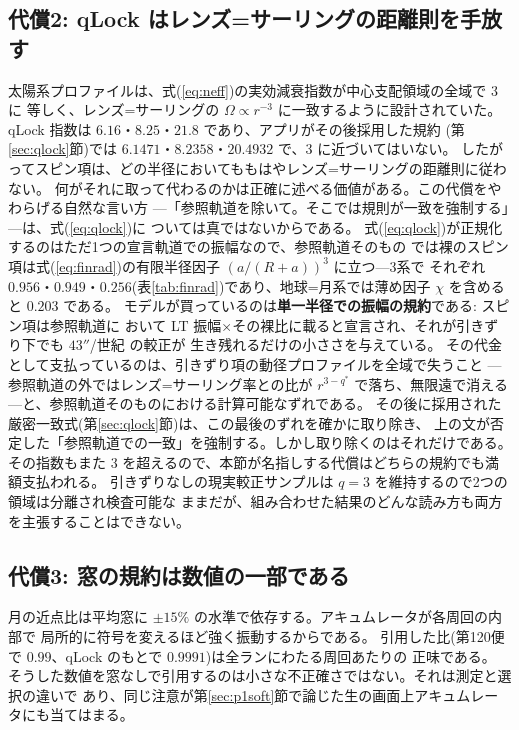 \documentclass[a4paper,10pt,twocolumn]{ltjsarticle}
\begin{document}
\subsection{代償2: qLock はレンズ=サーリングの距離則を手放す}
\label{sec:cost2}

太陽系プロファイルは、式(\ref{eq:neff})の実効減衰指数が中心支配領域の全域で $3$ に
等しく、レンズ=サーリングの $\Omega\propto r^{-3}$ に一致するように設計されていた。
qLock 指数は $6.16$・$8.25$・$21.8$ であり、アプリがその後採用した規約
(第\ref{sec:qlock}節)では $6.1471$・$8.2358$・$20.4932$ で、$3$ に近づいてはいない。
したがってスピン項は、どの半径においてももはやレンズ=サーリングの距離則に従わない。
何がそれに取って代わるのかは正確に述べる価値がある。この代償をやわらげる自然な言い方
---「参照軌道を除いて。そこでは規則が一致を強制する」---は、式(\ref{eq:qlock})に
ついては真ではないからである。
式(\ref{eq:qlock})が正規化するのはただ1つの宣言軌道での振幅なので、参照軌道そのもの
では裸のスピン項は式(\ref{eq:finrad})の有限半径因子 $(a/(R+a))^{3}$ に立つ---3系で
それぞれ $0.956$・$0.949$・$0.256$(表\ref{tab:finrad})であり、地球=月系では薄め因子
$\chi$ を含めると $0.203$ である。
モデルが買っているのは\textbf{単一半径での振幅の規約}である: スピン項は参照軌道に
おいて LT 振幅×その裸比に載ると宣言され、それが引きずり下でも $43''$/世紀 の較正が
生き残れるだけの小ささを与えている。
その代金として支払っているのは、引きずり項の動径プロファイルを全域で失うこと
---参照軌道の外ではレンズ=サーリング率との比が $r^{3-q^{*}}$ で落ち、無限遠で消える
---と、参照軌道そのものにおける計算可能なずれである。
その後に採用された厳密一致式(第\ref{sec:qlock}節)は、この最後のずれを確かに取り除き、
上の文が否定した「参照軌道での一致」を強制する。しかし取り除くのはそれだけである。
その指数もまた $3$ を超えるので、本節が名指しする代償はどちらの規約でも満額支払われる。
引きずりなしの現実較正サンプルは $q=3$ を維持するので2つの領域は分離され検査可能な
ままだが、組み合わせた結果のどんな読み方も両方を主張することはできない。

\subsection{代償3: 窓の規約は数値の一部である}
\label{sec:cost3}

月の近点比は平均窓に $\pm15\%$ の水準で依存する。アキュムレータが各周回の内部で
局所的に符号を変えるほど強く振動するからである。
引用した比(第120便で $0.99$、qLock のもとで $0.9991$)は全ランにわたる周回あたりの
正味である。
そうした数値を窓なしで引用するのは小さな不正確さではない。それは測定と選択の違いで
あり、同じ注意が第\ref{sec:p1soft}節で論じた生の画面上アキュムレータにも当てはまる。
\end{document}
